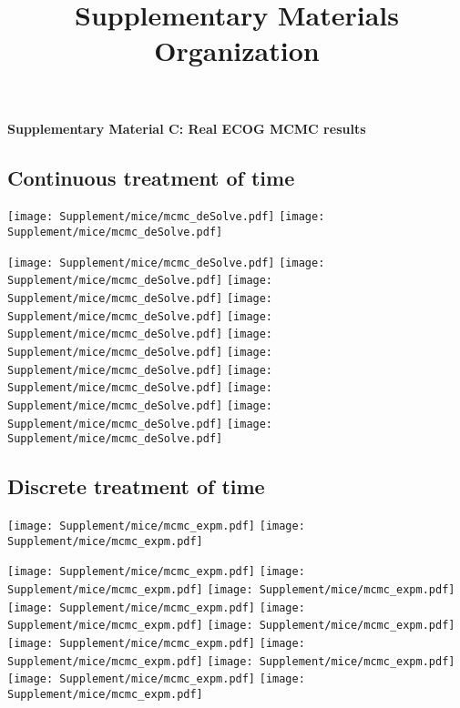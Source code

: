 \documentclass{article}
\title{Supplementary Materials Organization}
\date{\vspace{-5ex}}
\begin{document}
\noindent \textbf{\LARGE Supplementary Material C: Real ECOG MCMC results}\\
\subsection*{Continuous treatment of time}
\begin{center}
    \texttt{[image: Supplement/mice/mcmc\_deSolve.pdf]}
    \texttt{[image: Supplement/mice/mcmc\_deSolve.pdf]}
\end{center}
\begin{center}
    \texttt{[image: Supplement/mice/mcmc\_deSolve.pdf]}
    \texttt{[image: Supplement/mice/mcmc\_deSolve.pdf]}
    \texttt{[image: Supplement/mice/mcmc\_deSolve.pdf]}
    \texttt{[image: Supplement/mice/mcmc\_deSolve.pdf]}
    \texttt{[image: Supplement/mice/mcmc\_deSolve.pdf]}
    \texttt{[image: Supplement/mice/mcmc\_deSolve.pdf]}
    \texttt{[image: Supplement/mice/mcmc\_deSolve.pdf]}
    \texttt{[image: Supplement/mice/mcmc\_deSolve.pdf]}
    \texttt{[image: Supplement/mice/mcmc\_deSolve.pdf]}
    \texttt{[image: Supplement/mice/mcmc\_deSolve.pdf]}
    \texttt{[image: Supplement/mice/mcmc\_deSolve.pdf]}
\end{center}

\newpage
\subsection*{Discrete treatment of time}
\begin{center}
    \texttt{[image: Supplement/mice/mcmc\_expm.pdf]}
    \texttt{[image: Supplement/mice/mcmc\_expm.pdf]}
\end{center}
\begin{center}
    \texttt{[image: Supplement/mice/mcmc\_expm.pdf]}
    \texttt{[image: Supplement/mice/mcmc\_expm.pdf]}
    \texttt{[image: Supplement/mice/mcmc\_expm.pdf]}
    \texttt{[image: Supplement/mice/mcmc\_expm.pdf]}
    \texttt{[image: Supplement/mice/mcmc\_expm.pdf]}
    \texttt{[image: Supplement/mice/mcmc\_expm.pdf]}
    \texttt{[image: Supplement/mice/mcmc\_expm.pdf]}
    \texttt{[image: Supplement/mice/mcmc\_expm.pdf]}
    \texttt{[image: Supplement/mice/mcmc\_expm.pdf]}
    \texttt{[image: Supplement/mice/mcmc\_expm.pdf]}
    \texttt{[image: Supplement/mice/mcmc\_expm.pdf]}
\end{center}
\end{document}
